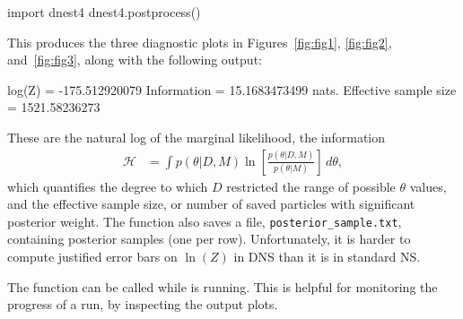 \documentclass[article, nojss]{jss}
\begin{document}
\begin{CodeChunk}
\begin{CodeInput}
import dnest4
dnest4.postprocess()
\end{CodeInput}
\end{CodeChunk}
This produces the three diagnostic plots in Figures~\ref{fig:fig1},
\ref{fig:fig2}, and~\ref{fig:fig3}, along with the following output:
\begin{CodeChunk}
\begin{CodeOutput}
log(Z) = -175.512920079
Information = 15.1683473499 nats.
Effective sample size = 1521.58236273
\end{CodeOutput}
\end{CodeChunk}
These are the natural log of the marginal likelihood, the
information
\begin{align}
\mathcal{H} &= \int p(\theta|D, M)
\ln\left[\frac{p(\theta | D, M)}{p(\theta | M)}\right] \, d\theta,
\end{align}
which quantifies the degree to which $D$ restricted the
range of possible $\theta$ values,
and the effective sample size,
or number of saved particles with significant posterior weight.
The  function also saves a file,
{\tt posterior\_sample.txt}, containing posterior samples (one per row).
Unfortunately, it is harder to compute justified error bars on $\ln(Z)$
in DNS than it is in standard NS.

The  function can be called while  is running.
This is helpful for monitoring the progress of a run, by inspecting the
output plots.
\end{document}
